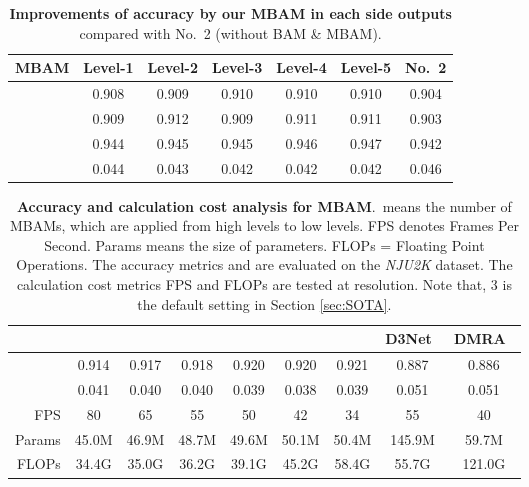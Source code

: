 \documentclass[journal]{IEEEtran}
\newcommand{\secref}[1]{Section \ref{#1}}
\newcommand{\DMRA}{DMRA~\cite{piao2019depth}}
\newcommand{\DTNet}{D3Net~\cite{fan2019D3Net}}
\begin{document}
\begin{table}[t!]
	\centering
	\small
	\caption{\textbf{Improvements of accuracy by our MBAM in each side outputs} compared with No.\ 2 (without BAM \& MBAM).  
	}
	\renewcommand{\arraystretch}{1.0}
	\renewcommand{\tabcolsep}{1.5mm}
	\begin{tabular}{c|ccccc|c}
		\hline\toprule
		MBAM    & Level-1   & Level-2    & Level-3  & Level-4   &  Level-5 & No.\ 2     \\
		\hline
		      & 0.908 & 0.909 & 0.910  & 0.910 & 0.910 & 0.904 \\
		       & 0.909 & 0.912 & 0.909  & 0.911 & 0.911 & 0.903 \\
		         & 0.944 & 0.945 & 0.945  & 0.946 & 0.947 & 0.942 \\
		   & 0.044 & 0.043 & 0.042  & 0.042 & 0.042 & 0.046 \\
		\bottomrule 
		\hline
	\end{tabular}
	\label{tab:MBAM_level}
\end{table}




\begin{table*}[t]
	\centering
	\small
	\renewcommand{\arraystretch}{1.2}
	\renewcommand{\tabcolsep}{4.5mm}
	\caption{\textbf{Accuracy and calculation cost analysis for MBAM}.\  means the number of MBAMs, which are applied from high levels to low levels.
		FPS denotes Frames Per Second.
		Params means the size of parameters.
		FLOPs = Floating Point Operations.
		The accuracy metrics  and  are evaluated on the \textit{NJU2K} dataset.
		The calculation cost metrics FPS and FLOPs are tested at  resolution.
		Note that, 3 is  the default setting in \secref{sec:SOTA}.}
	\begin{tabular}{r|cccccc|cc}
		\hline\toprule
&  &   &  &   &    &   &\DTNet  &\DMRA \\
		\hline
		      & 0.914      &  0.917      &  0.918     & 0.920       &  0.920  &  0.921     & 0.887   & 0.886\\
		  & 0.041      &  0.040      &  0.040     & 0.039       &  0.038  &  0.039     & 0.051   & 0.051\\
FPS            & 80   &  65   & 55   & 50    & 42&  34  &55 & 40 \\
		Params       & 45.0M      &  46.9M      &  48.7M     & 49.6M       &  50.1M  &  50.4M     & 145.9M  &59.7M\\
		FLOPs        & 34.4G      &  35.0G      &  36.2G     & 39.1G       &  45.2G  &  58.4G     & 55.7G   &121.0G\\
\bottomrule
		\hline
	\end{tabular}
	\label{tab:MBAM}
\end{table*}
\end{document}
